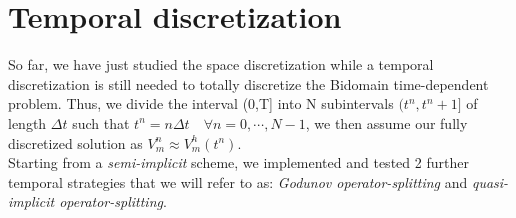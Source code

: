 \documentclass[a4paper,11pt]{article}
\begin{document}
\newpage 
\section{Temporal discretization}\label{temporal_discretization}
So far, we have just studied the space discretization while a temporal discretization is still needed to totally discretize the Bidomain time-dependent problem. Thus, we divide the interval (0,T] into N subintervals $(t^n,t^n+1]$ of length $\Delta t$ such that $t^n=n \Delta t \quad \forall n=0,\cdots,N-1$, we then assume our fully discretized solution as $V_m^n\approx V_m^h(t^n)$. \\
Starting from a \emph{semi-implicit} scheme, we implemented and tested 2 further temporal strategies that we will refer to as: \emph{Godunov operator-splitting} and \emph{quasi-implicit operator-splitting}. 
\end{document}
